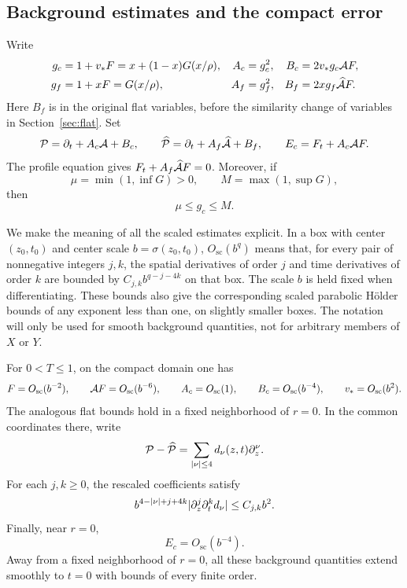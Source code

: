 \subsection{Background estimates and the compact error}

Write
\begin{align*}
 g_c&=1+v_*F=x+(1-x)G(x/\rho),&
 A_c&=g_c^2,& B_c&=2v_*g_c\mathcal A F,\\
 g_f&=1+xF=G(x/\rho),&
 A_f&=g_f^2,& B_f&=2xg_f\widehat{\mathcal A} F.
\end{align*}
Here $B_f$ is in the original flat variables, before the similarity
change of variables in Section~\ref{sec:flat}.  Set
\begin{equation}\label{glue:linearizations}
 \mathcal P=\partial_t+A_c\mathcal A+B_c,\qquad
 \widehat{\mathcal P}=\partial_t+A_f\widehat{\mathcal A}+B_f,\qquad
 E_c=F_t+A_c\mathcal A F.
\end{equation}
The profile equation gives $F_t+A_f\widehat{\mathcal A} F=0$.  Moreover, if
\[
 \mu=\min(1,\inf G)>0,\qquad M=\max(1,\sup G),
\]
then
\begin{equation}\label{glue:background-positive}
 \mu\le g_c\le M.
\end{equation}

We make the meaning of all the scaled estimates explicit.  In a box
with center $(z_0,t_0)$ and center scale $b=\sigma(z_0,t_0)$,
$O_{\mathrm{sc}}(b^q)$ means that, for every pair of nonnegative integers
$j,k$, the spatial derivatives of order $j$ and time derivatives of
order $k$ are bounded by $C_{j,k}b^{q-j-4k}$ on that box.  The scale $b$
is held fixed when differentiating.  These bounds also give the
corresponding scaled parabolic H\"older bounds of any exponent less
than one, on slightly smaller boxes.  The notation will only be used
for smooth background quantities, not for arbitrary members of $X$
or $Y$.

\begin{lemma}\label{glue:background}
For $0<T\le1$, on the compact domain one has
\begin{equation}\label{glue:background-bounds}
 F=O_{\mathrm{sc}}(b^{-2}),\qquad
 \mathcal A F=O_{\mathrm{sc}}(b^{-6}),\qquad
 A_c=O_{\mathrm{sc}}(1),\qquad
 B_c=O_{\mathrm{sc}}(b^{-4}),\qquad
 v_*=O_{\mathrm{sc}}(b^2).
\end{equation}
The analogous flat bounds hold in a fixed neighborhood of $r=0$.
In the common coordinates there, write
\[
 \mathcal P-\widehat{\mathcal P}=\sum_{|\nu|\le4}d_\nu(z,t)\partial_z^\nu.
\]
For each $j,k\ge0$, the rescaled coefficients satisfy
\begin{equation}\label{glue:mismatch-coeff}
 b^{4-|\nu|+j+4k}
 \lvert \partial_z^j\partial_t^k d_\nu\rvert\le C_{j,k}b^2.
\end{equation}
Finally, near $r=0$,
\begin{equation}\label{glue:error-order}
 E_c=O_{\mathrm{sc}}(b^{-4}).
\end{equation}
Away from a fixed neighborhood of $r=0$, all these background
quantities extend smoothly to $t=0$ with bounds of every finite order.
\end{lemma}


